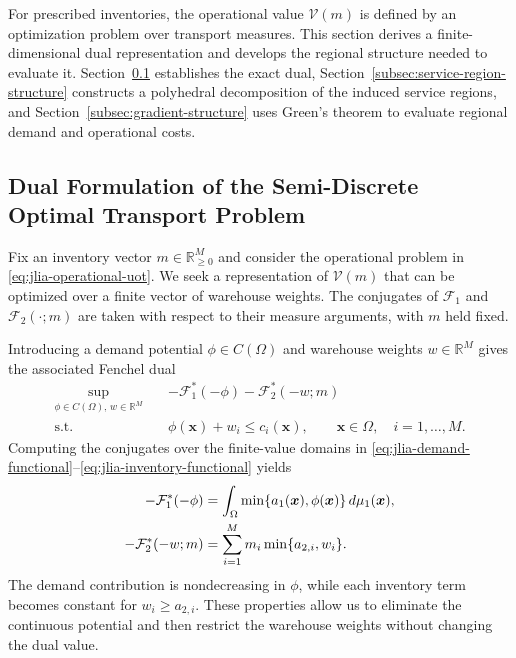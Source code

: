 \documentclass[a4paper,fleqn]{cas-sc}
\theoremstyle{remark}
\theoremstyle{plain}
\begin{document}
For prescribed inventories, the operational value $\mathcal V(m)$ is defined by an optimization problem over transport measures. This section derives a finite-dimensional dual representation and develops the regional structure needed to evaluate it. Section~\ref{subsec:dual-semidiscrete} establishes the exact dual, Section~\ref{subsec:service-region-structure} constructs a polyhedral decomposition of the induced service regions, and Section~\ref{subsec:gradient-structure} uses Green's theorem to evaluate regional demand and operational costs.

\subsection{Dual Formulation of the Semi-Discrete Optimal Transport Problem}\label{subsec:dual-semidiscrete}

Fix an inventory vector $m\in\mathbb R_{\ge0}^M$ and consider the operational problem in \eqref{eq:jlia-operational-uot}. We seek a representation of $\mathcal V(m)$ that can be optimized over a finite vector of warehouse weights. The conjugates of $\mathcal F_1$ and $\mathcal F_2(\cdot;m)$ are taken with respect to their measure arguments, with $m$ held fixed.

Introducing a demand potential $\phi\in C(\Omega)$ and warehouse weights $w\in\mathbb R^M$ gives the associated Fenchel dual
\begin{equation}\label{eq:fenchel-dual}
\begin{aligned}
    \sup_{\phi\in C(\Omega),\,w\in\mathbb R^M}\quad
        &-\mathcal F_1^*(-\phi)-\mathcal F_2^*(-w;m)\\
    \text{s.t.}\quad
        &\phi(\bm x)+w_i\le c_i(\bm x),\qquad \bm x\in\Omega,\quad i=1,\ldots,M.
\end{aligned}
\end{equation}
Computing the conjugates over the finite-value domains in \eqref{eq:jlia-demand-functional}--\eqref{eq:jlia-inventory-functional} yields
\begin{subequations}\label{eq:marginal-conjugates}
\allowdisplaybreaks[0]
\begin{align}
    -\mathcal F_1^*(-\phi)
        &=\int_\Omega\min\{a_1(\bm x),\phi(\bm x)\}\,d\mu_1(\bm x),
        \label{eq:demand-conjugate}\\
    -\mathcal F_2^*(-w;m)
        &=\sum_{i=1}^M m_i\min\{a_{2,i},w_i\}.
        \label{eq:inventory-conjugate}
\end{align}
\end{subequations}
The demand contribution is nondecreasing in $\phi$, while each inventory term becomes constant for $w_i\ge a_{2,i}$. These properties allow us to eliminate the continuous potential and then restrict the warehouse weights without changing the dual value.
\end{document}
